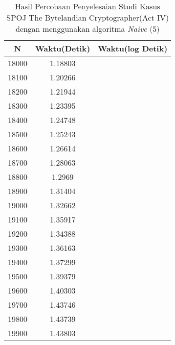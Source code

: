 \begin{table}[H]
\centering
\caption {Hasil Percobaan Penyelesaian Studi Kasus SPOJ The Bytelandian Cryptographer(Act IV) dengan menggunakan algoritma \textit{Naive} (5)}
\begin{tabular}{|c|c|c|}\hline
N&Waktu(Detik)&Waktu(log Detik)\\ \hline
18000&1.18803\\ \hline
18100&1.20266\\ \hline
18200&1.21944\\ \hline
18300&1.23395\\ \hline
18400&1.24748\\ \hline
18500&1.25243\\ \hline
18600&1.26614\\ \hline
18700&1.28063\\ \hline
18800&1.2969\\ \hline
18900&1.31404\\ \hline
19000&1.32662\\ \hline
19100&1.35917\\ \hline
19200&1.34388\\ \hline
19300&1.36163\\ \hline
19400&1.37299\\ \hline
19500&1.39379\\ \hline
19600&1.40303\\ \hline
19700&1.43746\\ \hline
19800&1.43739\\ \hline
19900&1.43803\\ \hline
\end{tabular}
\label{tab:res10}
\end{table}